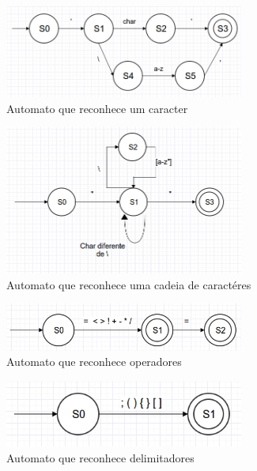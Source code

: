 \begin{figure}[H]
  \caption{Automato que reconhece um caracter}
  \centering
    \includegraphics[width=0.7\textwidth]{../0-lexico/automatos/char}
\end{figure}

\begin{figure}[H]
  \caption{Automato que reconhece uma cadeia de caractéres}
  \centering
    \includegraphics[width=0.7\textwidth]{../0-lexico/automatos/string}
\end{figure}

\begin{figure}[H]
  \caption{Automato que reconhece operadores}
  \centering
    \includegraphics[width=0.7\textwidth]{../0-lexico/automatos/operators}
\end{figure}

\begin{figure}[H]
  \caption{Automato que reconhece delimitadores}
  \centering
    \includegraphics[width=0.7\textwidth]{../0-lexico/automatos/delimiters}
\end{figure}

